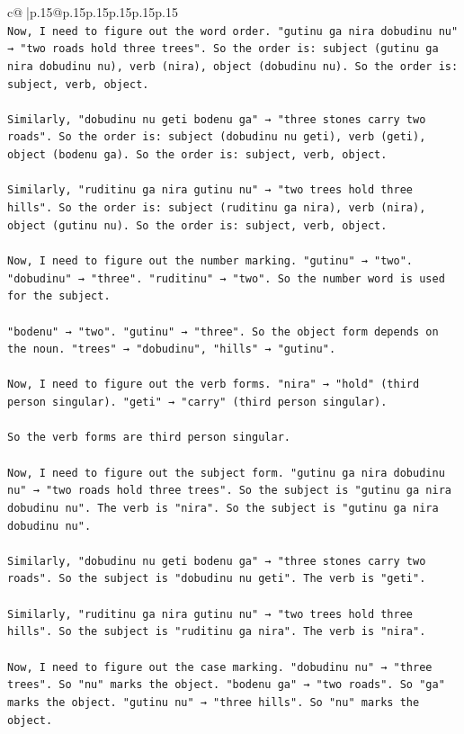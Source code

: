 \documentclass{article}
\begin{document}
{\begin{supertabular}{c@{$\;$}|p{.15\linewidth}@{}p{.15\linewidth}p{.15\linewidth}p{.15\linewidth}p{.15\linewidth}p{.15\linewidth}}
{{{\\ 
\texttt{Now, I need to figure out the word order. "gutinu ga nira dobudinu nu" → "two roads hold three trees". So the order is: subject (gutinu ga nira dobudinu nu), verb (nira), object (dobudinu nu). So the order is: subject, verb, object.} \\
\\ 
\texttt{Similarly, "dobudinu nu geti bodenu ga" → "three stones carry two roads". So the order is: subject (dobudinu nu geti), verb (geti), object (bodenu ga). So the order is: subject, verb, object.} \\
\\ 
\texttt{Similarly, "ruditinu ga nira gutinu nu" → "two trees hold three hills". So the order is: subject (ruditinu ga nira), verb (nira), object (gutinu nu). So the order is: subject, verb, object.} \\
\\ 
\texttt{Now, I need to figure out the number marking. "gutinu" → "two". "dobudinu" → "three". "ruditinu" → "two". So the number word is used for the subject.} \\
\\ 
\texttt{"bodenu" → "two". "gutinu" → "three". So the object form depends on the noun. "trees" → "dobudinu", "hills" → "gutinu".} \\
\\ 
\texttt{Now, I need to figure out the verb forms. "nira" → "hold" (third person singular). "geti" → "carry" (third person singular).} \\
\\ 
\texttt{So the verb forms are third person singular.} \\
\\ 
\texttt{Now, I need to figure out the subject form. "gutinu ga nira dobudinu nu" → "two roads hold three trees". So the subject is "gutinu ga nira dobudinu nu". The verb is "nira". So the subject is "gutinu ga nira dobudinu nu".} \\
\\ 
\texttt{Similarly, "dobudinu nu geti bodenu ga" → "three stones carry two roads". So the subject is "dobudinu nu geti". The verb is "geti".} \\
\\ 
\texttt{Similarly, "ruditinu ga nira gutinu nu" → "two trees hold three hills". So the subject is "ruditinu ga nira". The verb is "nira".} \\
\\ 
\texttt{Now, I need to figure out the case marking. "dobudinu nu" → "three trees". So "nu" marks the object. "bodenu ga" → "two roads". So "ga" marks the object. "gutinu nu" → "three hills". So "nu" marks the object.} \\
}}}
\end{supertabular}}
\end{document}

